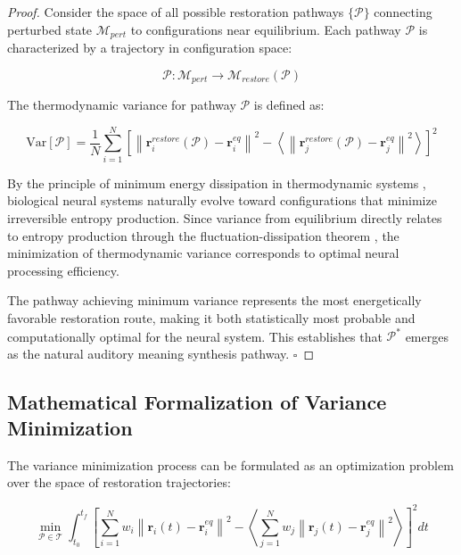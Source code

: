 \documentclass[12pt,a4paper]{article}
\begin{document}
\begin{proof}
Consider the space of all possible restoration pathways $\{\mathcal{P}\}$ connecting perturbed state $\mathcal{M}_{pert}$ to configurations near equilibrium. Each pathway $\mathcal{P}$ is characterized by a trajectory in configuration space:

\begin{equation}
\mathcal{P}: \mathcal{M}_{pert} \to \mathcal{M}_{restore}(\mathcal{P})
\end{equation}

The thermodynamic variance for pathway $\mathcal{P}$ is defined as:

\begin{equation}
\text{Var}[\mathcal{P}] = \frac{1}{N} \sum_{i=1}^{N} \left[ \left\| \mathbf{r}_i^{restore}(\mathcal{P}) - \mathbf{r}_i^{eq} \right\|^2 - \left\langle \left\| \mathbf{r}_j^{restore}(\mathcal{P}) - \mathbf{r}_j^{eq} \right\|^2 \right\rangle \right]^2
\end{equation}

By the principle of minimum energy dissipation in thermodynamic systems \citep{onsager1931reciprocal}, biological neural systems naturally evolve toward configurations that minimize irreversible entropy production. Since variance from equilibrium directly relates to entropy production through the fluctuation-dissipation theorem \citep{kubo1966fluctuation}, the minimization of thermodynamic variance corresponds to optimal neural processing efficiency.

The pathway achieving minimum variance represents the most energetically favorable restoration route, making it both statistically most probable and computationally optimal for the neural system. This establishes that $\mathcal{P}^*$ emerges as the natural auditory meaning synthesis pathway. $\square$
\end{proof}

\subsection{Mathematical Formalization of Variance Minimization}

The variance minimization process can be formulated as an optimization problem over the space of restoration trajectories:

\begin{equation}
\min_{\mathcal{P} \in \mathcal{T}} \int_{t_0}^{t_f} \left[ \sum_{i=1}^{N} w_i \left\| \mathbf{r}_i(t) - \mathbf{r}_i^{eq} \right\|^2 - \left\langle \sum_{j=1}^{N} w_j \left\| \mathbf{r}_j(t) - \mathbf{r}_j^{eq} \right\|^2 \right\rangle \right]^2 dt
\end{equation}
\end{document}

